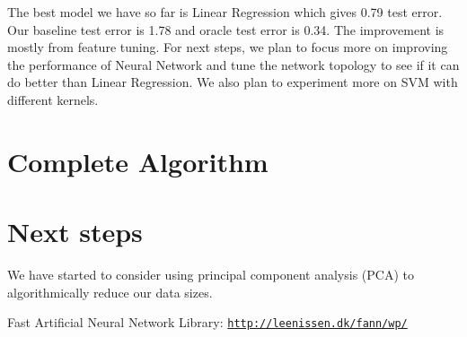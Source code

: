 \documentclass[journal]{IEEEtran}
\begin{document}
The best model we have so far is Linear Regression which gives 0.79 test error.
Our baseline test error is 1.78 and oracle test error is 0.34. The improvement
is mostly from feature tuning. For next steps, we plan to focus more on
improving the performance of Neural Network and tune the network topology to
see if it can do better than Linear Regression. We also plan to experiment more
on SVM with different kernels.

\section{Complete Algorithm}

\section{Next steps}
We have started to consider using principal component analysis (PCA) to
algorithmically reduce our data sizes.


%
%
%
\begin{thebibliography}{1}
Fast Artificial Neural Network Library: \texttt{\url{http://leenissen.dk/fann/wp/}}
\end{thebibliography}


\end{document}
